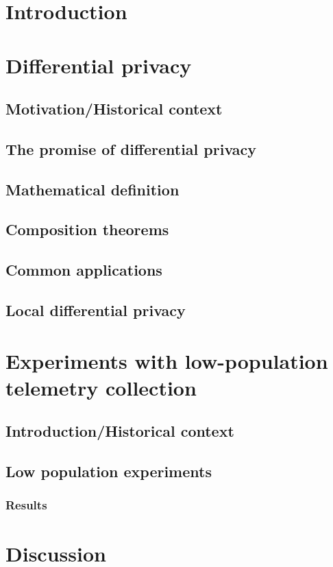 \documentclass[12pt]{article}
\begin{document}
\section{Introduction}

\section{Differential privacy}

\subsection{Motivation/Historical context}

\subsection{The promise of differential privacy}

\subsection{Mathematical definition}

\subsection{Composition theorems}

\subsection{Common applications}

\subsection{Local differential privacy}

\section{Experiments with low-population telemetry collection}

\subsection{Introduction/Historical context}

\subsection{Low population experiments}

\subsubsection{Results}

\section{Discussion}

\cite{test}




\end{document}
